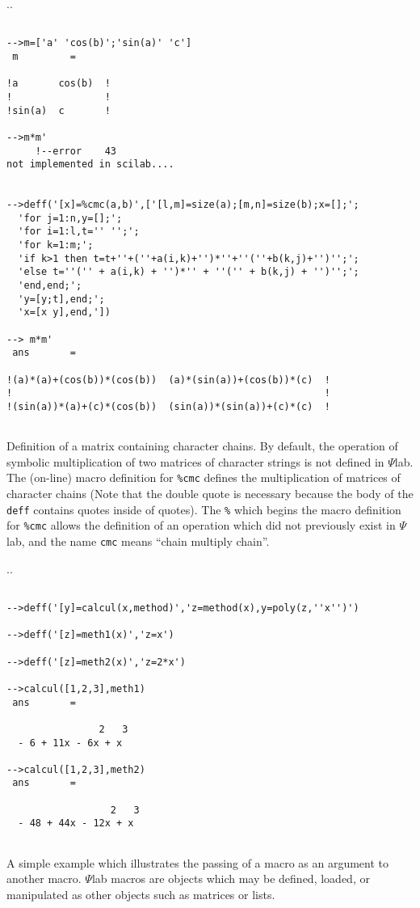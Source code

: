 \noindent.\dotfill.
\begin{verbatim}
 
-->m=['a' 'cos(b)';'sin(a)' 'c']
 m         =
 
!a       cos(b)  !
!                !
!sin(a)  c       !
 
-->m*m'
     !--error    43 
not implemented in scilab....
 
 
-->deff('[x]=%cmc(a,b)',['[l,m]=size(a);[m,n]=size(b);x=[];';
  'for j=1:n,y=[];';
  'for i=1:l,t='' '';';
  'for k=1:m;';
  'if k>1 then t=t+''+(''+a(i,k)+'')*''+''(''+b(k,j)+'')'';';
  'else t=''('' + a(i,k) + '')*'' + ''('' + b(k,j) + '')'';';
  'end,end;';
  'y=[y;t],end;';
  'x=[x y],end,'])
 
--> m*m'
 ans       =
 
!(a)*(a)+(cos(b))*(cos(b))  (a)*(sin(a))+(cos(b))*(c)  !
!                                                      !
!(sin(a))*(a)+(c)*(cos(b))  (sin(a))*(sin(a))+(c)*(c)  !
 
\end{verbatim}
Definition of a matrix containing character chains. By default, the 
operation of symbolic multiplication of two matrices of character
strings is not defined in $\Psi$lab.  The (on-line)
macro definition for {\tt \%cmc} defines the multiplication of 
matrices of character chains (Note that the double quote is necessary
because the body of the {\tt deff} contains quotes inside of quotes).
The {\tt \%} which begins the macro definition for {\tt \%cmc}
allows the definition of an operation which did not previously 
exist in $\Psi$lab, and the name {\tt cmc} means ``chain multiply chain''.

\noindent.\dotfill.
\begin{verbatim}
 
-->deff('[y]=calcul(x,method)','z=method(x),y=poly(z,''x'')')
 
-->deff('[z]=meth1(x)','z=x')
 
-->deff('[z]=meth2(x)','z=2*x')
 
-->calcul([1,2,3],meth1)
 ans       =
 
                2   3  
  - 6 + 11x - 6x + x   
 
-->calcul([1,2,3],meth2)
 ans       =
 
                  2   3  
  - 48 + 44x - 12x + x   
 
\end{verbatim}
A simple example which illustrates the passing of a macro as an argument
to another macro. $\Psi$lab macros are objects which may be defined, loaded,
or manipulated as other objects such as matrices or lists.

